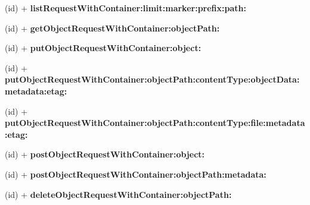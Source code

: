 \begin{DoxyCompactItemize}
\item 
\hypertarget{interface_a_s_i_cloud_files_object_request_a67e5f2848052dcdf80aac2ffd4f64525}{
(id) + {\bfseries list\-Request\-With\-Container\-:limit\-:marker\-:prefix\-:path\-:}}
\label{interface_a_s_i_cloud_files_object_request_a67e5f2848052dcdf80aac2ffd4f64525}

\item 
\hypertarget{interface_a_s_i_cloud_files_object_request_ac41ac1686f40dd0b25f473b95de56a2b}{
(id) + {\bfseries get\-Object\-Request\-With\-Container\-:object\-Path\-:}}
\label{interface_a_s_i_cloud_files_object_request_ac41ac1686f40dd0b25f473b95de56a2b}

\item 
\hypertarget{interface_a_s_i_cloud_files_object_request_ac9c57b5595d42ea6fdb13b9baa5ad073}{
(id) + {\bfseries put\-Object\-Request\-With\-Container\-:object\-:}}
\label{interface_a_s_i_cloud_files_object_request_ac9c57b5595d42ea6fdb13b9baa5ad073}

\item 
\hypertarget{interface_a_s_i_cloud_files_object_request_a51fd51b32cb64756aa6fbc3f50ff7df4}{
(id) + {\bfseries put\-Object\-Request\-With\-Container\-:object\-Path\-:content\-Type\-:object\-Data\-:metadata\-:etag\-:}}
\label{interface_a_s_i_cloud_files_object_request_a51fd51b32cb64756aa6fbc3f50ff7df4}

\item 
\hypertarget{interface_a_s_i_cloud_files_object_request_a4fd2c82bc1702341d5a482f7ff46db4b}{
(id) + {\bfseries put\-Object\-Request\-With\-Container\-:object\-Path\-:content\-Type\-:file\-:metadata\-:etag\-:}}
\label{interface_a_s_i_cloud_files_object_request_a4fd2c82bc1702341d5a482f7ff46db4b}

\item 
\hypertarget{interface_a_s_i_cloud_files_object_request_ae713a0e0f7867895b33210be74770c47}{
(id) + {\bfseries post\-Object\-Request\-With\-Container\-:object\-:}}
\label{interface_a_s_i_cloud_files_object_request_ae713a0e0f7867895b33210be74770c47}

\item 
\hypertarget{interface_a_s_i_cloud_files_object_request_a594d1d7c8fc812dc9acc2c862809b603}{
(id) + {\bfseries post\-Object\-Request\-With\-Container\-:object\-Path\-:metadata\-:}}
\label{interface_a_s_i_cloud_files_object_request_a594d1d7c8fc812dc9acc2c862809b603}

\item 
\hypertarget{interface_a_s_i_cloud_files_object_request_a55f1c9c4f71e7e3314b23d144b96fbac}{
(id) + {\bfseries delete\-Object\-Request\-With\-Container\-:object\-Path\-:}}
\label{interface_a_s_i_cloud_files_object_request_a55f1c9c4f71e7e3314b23d144b96fbac}


\end{DoxyCompactItemize}
